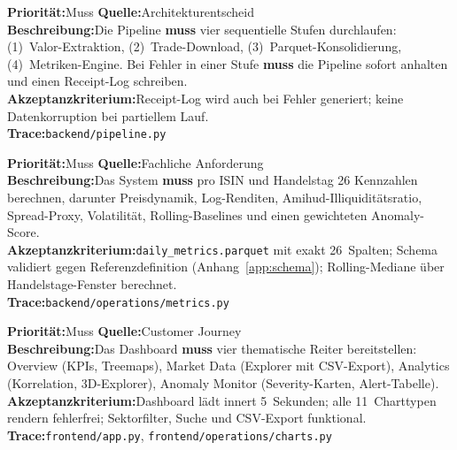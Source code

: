 \documentclass[11pt, a4paper, oneside, openany]{report}
\newcommand{\code}[1]{\texttt{\small\textcolor{DeepNavy}{#1}}}
\begin{document}
\vspace{6pt}

\begin{reqbox}
\textbf{Priorität:}\;Muss \quad \textbf{Quelle:}\;Architekturentscheid \\[4pt]
\textbf{Beschreibung:}\;Die Pipeline \textbf{muss} vier sequentielle Stufen durchlaufen: (1)~Valor-Extraktion, (2)~Trade-Download, (3)~Parquet-Konsolidierung, (4)~Metriken-Engine. Bei Fehler in einer Stufe \textbf{muss} die Pipeline sofort anhalten und einen Receipt-Log schreiben. \\[4pt]
\textbf{Akzeptanzkriterium:}\;Receipt-Log wird auch bei Fehler generiert; keine Datenkorruption bei partiellem Lauf. \\[4pt]
\textbf{Trace:}\;\code{backend/pipeline.py}
\end{reqbox}

\vspace{6pt}

\begin{reqbox}
\textbf{Priorität:}\;Muss \quad \textbf{Quelle:}\;Fachliche Anforderung \\[4pt]
\textbf{Beschreibung:}\;Das System \textbf{muss} pro ISIN und Handelstag 26 Kennzahlen berechnen, darunter Preisdynamik, Log-Renditen, Amihud-Illiquiditätsratio, Spread-Proxy, Volatilität, Rolling-Baselines und einen gewichteten Anomaly-Score. \\[4pt]
\textbf{Akzeptanzkriterium:}\;\code{daily\_metrics.parquet} mit exakt 26~Spalten; Schema validiert gegen Referenzdefinition (Anhang~\ref{app:schema}); Rolling-Mediane über Handelstage-Fenster berechnet. \\[4pt]
\textbf{Trace:}\;\code{backend/operations/metrics.py}
\end{reqbox}

\vspace{6pt}

\begin{reqbox}
\textbf{Priorität:}\;Muss \quad \textbf{Quelle:}\;Customer Journey \\[4pt]
\textbf{Beschreibung:}\;Das Dashboard \textbf{muss} vier thematische Reiter bereitstellen: Overview (KPIs, Treemaps), Market Data (Explorer mit CSV-Export), Analytics (Korrelation, 3D-Explorer), Anomaly Monitor (Severity-Karten, Alert-Tabelle). \\[4pt]
\textbf{Akzeptanzkriterium:}\;Dashboard lädt innert 5~Sekunden; alle 11~Charttypen rendern fehlerfrei; Sektorfilter, Suche und CSV-Export funktional. \\[4pt]
\textbf{Trace:}\;\code{frontend/app.py}, \code{frontend/operations/charts.py}
\end{reqbox}
\end{document}
